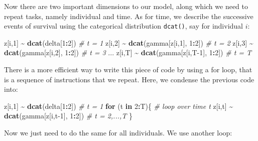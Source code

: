 \documentclass[
  12pt,
]{krantz}
\newenvironment{Shaded}{\begin{snugshade}}{\end{snugshade}}
\newcommand{\CommentTok}[1]{\textcolor[rgb]{0.56,0.35,0.01}{\textit{#1}}}
\newcommand{\ControlFlowTok}[1]{\textcolor[rgb]{0.13,0.29,0.53}{\textbf{#1}}}
\newcommand{\DecValTok}[1]{\textcolor[rgb]{0.00,0.00,0.81}{#1}}
\newcommand{\FunctionTok}[1]{\textcolor[rgb]{0.13,0.29,0.53}{\textbf{#1}}}
\newcommand{\NormalTok}[1]{#1}
\newcommand{\SpecialCharTok}[1]{\textcolor[rgb]{0.81,0.36,0.00}{\textbf{#1}}}
\begin{document}
Now there are two important dimensions to our model, along which we need to repeat tasks, namely individual and time. As for time, we describe the successive events of survival using the categorical distribution \texttt{dcat()}, say for individual \(i\):

\begin{Shaded}
\begin{Highlighting}[]
\NormalTok{z[i,}\DecValTok{1}\NormalTok{] }\SpecialCharTok{\textasciitilde{}} \FunctionTok{dcat}\NormalTok{(delta[}\DecValTok{1}\SpecialCharTok{:}\DecValTok{2}\NormalTok{])           }\CommentTok{\# t = 1}
\NormalTok{z[i,}\DecValTok{2}\NormalTok{] }\SpecialCharTok{\textasciitilde{}} \FunctionTok{dcat}\NormalTok{(gamma[z[i,}\DecValTok{1}\NormalTok{], }\DecValTok{1}\SpecialCharTok{:}\DecValTok{2}\NormalTok{])   }\CommentTok{\# t = 2}
\NormalTok{z[i,}\DecValTok{3}\NormalTok{] }\SpecialCharTok{\textasciitilde{}} \FunctionTok{dcat}\NormalTok{(gamma[z[i,}\DecValTok{2}\NormalTok{], }\DecValTok{1}\SpecialCharTok{:}\DecValTok{2}\NormalTok{])   }\CommentTok{\# t = 3}
\NormalTok{...}
\NormalTok{z[i,T] }\SpecialCharTok{\textasciitilde{}} \FunctionTok{dcat}\NormalTok{(gamma[z[i,T}\DecValTok{{-}1}\NormalTok{], }\DecValTok{1}\SpecialCharTok{:}\DecValTok{2}\NormalTok{]) }\CommentTok{\# t = T}
\end{Highlighting}
\end{Shaded}

There is a more efficient way to write this piece of code by using a for loop, that is a sequence of instructions that we repeat. Here, we condense the previous code into:

\begin{Shaded}
\begin{Highlighting}[]
\NormalTok{z[i,}\DecValTok{1}\NormalTok{] }\SpecialCharTok{\textasciitilde{}} \FunctionTok{dcat}\NormalTok{(delta[}\DecValTok{1}\SpecialCharTok{:}\DecValTok{2}\NormalTok{])             }\CommentTok{\# t = 1}
\ControlFlowTok{for}\NormalTok{ (t }\ControlFlowTok{in} \DecValTok{2}\SpecialCharTok{:}\NormalTok{T)\{ }\CommentTok{\# loop over time t}
\NormalTok{  z[i,t] }\SpecialCharTok{\textasciitilde{}} \FunctionTok{dcat}\NormalTok{(gamma[z[i,t}\DecValTok{{-}1}\NormalTok{], }\DecValTok{1}\SpecialCharTok{:}\DecValTok{2}\NormalTok{]) }\CommentTok{\# t = 2,...,T}
\NormalTok{\}}
\end{Highlighting}
\end{Shaded}

Now we just need to do the same for all individuals. We use another loop:
\end{document}
